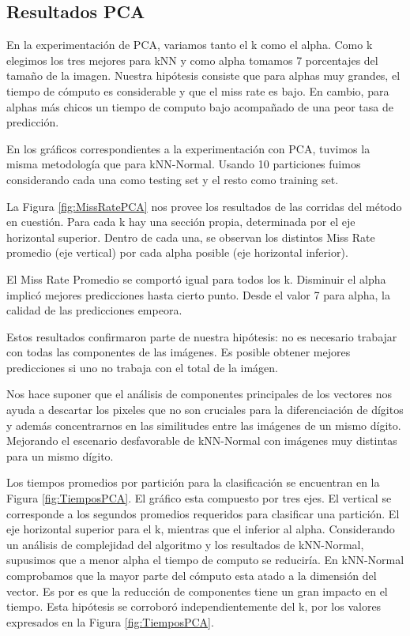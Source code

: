 \documentclass{article}
\begin{document}
\subsection*{Resultados PCA}

En la experimentación de PCA, variamos tanto el k como el alpha. Como k elegimos los tres mejores para kNN y como alpha tomamos 7 porcentajes del tamaño de la imagen. Nuestra hipótesis consiste que para alphas muy grandes, el tiempo de cómputo es considerable y que el miss rate es bajo. En cambio, para alphas más chicos un tiempo de computo bajo acompañado de una peor tasa de predicción. 

En los gráficos correspondientes a la experimentación con PCA, tuvimos la misma metodología que para kNN-Normal. Usando 10 particiones fuimos considerando cada una como testing set y el resto como training set.

La Figura \ref{fig:MissRatePCA} nos provee los resultados de las corridas del método en cuestión. Para cada k hay una sección propia, determinada por el eje horizontal superior. Dentro de cada una, se observan los distintos Miss Rate promedio (eje vertical) por cada alpha posible (eje horizontal inferior). 

El Miss Rate Promedio se comportó igual para todos los k. Disminuir el alpha implicó mejores predicciones hasta cierto punto. Desde el valor 7 para alpha, la calidad de las predicciones empeora. 

Estos resultados confirmaron parte de nuestra hipótesis: no es necesario trabajar con todas las componentes de las imágenes. Es posible obtener mejores predicciones si uno no trabaja con el total de la imágen. 

Nos hace suponer que el análisis de componentes principales de los vectores nos ayuda a descartar los pixeles que no son cruciales para la diferenciación de dígitos y además concentrarnos en las similitudes entre las imágenes de un mismo dígito. Mejorando el escenario desfavorable de kNN-Normal con imágenes muy distintas para un mismo dígito.


Los tiempos promedios por partición para la clasificación se encuentran en la Figura \ref{fig:TiemposPCA}. El gráfico esta compuesto por tres ejes. El vertical se corresponde a los segundos promedios requeridos para clasificar una partición. El eje horizontal superior para el k, mientras que el inferior al alpha. 
Considerando un análisis de complejidad del algoritmo y los resultados de kNN-Normal, supusimos que a menor alpha el tiempo de computo se reduciría. En kNN-Normal comprobamos que la mayor parte del cómputo esta atado a la dimensión del vector. Es por es que la reducción de componentes tiene un gran impacto en el tiempo. Esta hipótesis se corroboró independientemente del k, por los valores expresados en la Figura \ref{fig:TiemposPCA}.
\end{document}
